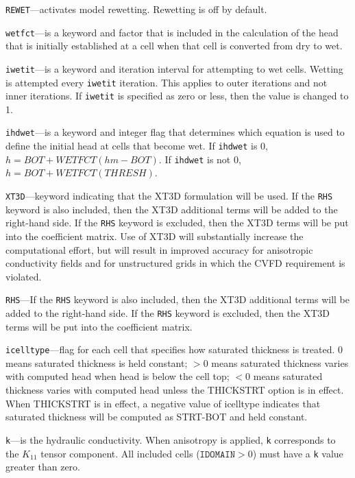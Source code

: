\item \texttt{REWET}---activates model rewetting.  Rewetting is off by default.

\item \texttt{wetfct}---is a keyword and factor that is included in the calculation of the head that is initially established at a cell when that cell is converted from dry to wet.

\item \texttt{iwetit}---is a keyword and iteration interval for attempting to wet cells. Wetting is attempted every \texttt{iwetit} iteration. This applies to outer iterations and not inner iterations. If \texttt{iwetit} is specified as zero or less, then the value is changed to 1.

\item \texttt{ihdwet}---is a keyword and integer flag that determines which equation is used to define the initial head at cells that become wet.  If \texttt{ihdwet} is 0, $h = BOT + WETFCT (hm - BOT)$. If \texttt{ihdwet} is not 0, $h = BOT + WETFCT (THRESH)$.

\item \texttt{XT3D}---keyword indicating that the XT3D formulation will be used.  If the \texttt{RHS} keyword is also included, then the XT3D additional terms will be added to the right-hand side.  If the \texttt{RHS} keyword is excluded, then the XT3D terms will be put into the coefficient matrix.  Use of XT3D will substantially increase the computational effort, but will result in improved accuracy for anisotropic conductivity fields and for unstructured grids in which the CVFD requirement is violated.

\item \texttt{RHS}---If the \texttt{RHS} keyword is also included, then the XT3D additional terms will be added to the right-hand side.  If the \texttt{RHS} keyword is excluded, then the XT3D terms will be put into the coefficient matrix.

\item \texttt{icelltype}---flag for each cell that specifies how saturated thickness is treated.  0 means saturated thickness is held constant;  $>$0 means saturated thickness varies with computed head when head is below the cell top; $<$0 means saturated thickness varies with computed head unless the THICKSTRT option is in effect.  When THICKSTRT is in effect, a negative value of icelltype indicates that saturated thickness will be computed as STRT-BOT and held constant.

\item \texttt{k}---is the hydraulic conductivity.  When anisotropy is applied, \texttt{k} corresponds to the $K_{11}$ tensor component.  All included cells ($\texttt{IDOMAIN} > 0$) must have a \texttt{k} value greater than zero.

